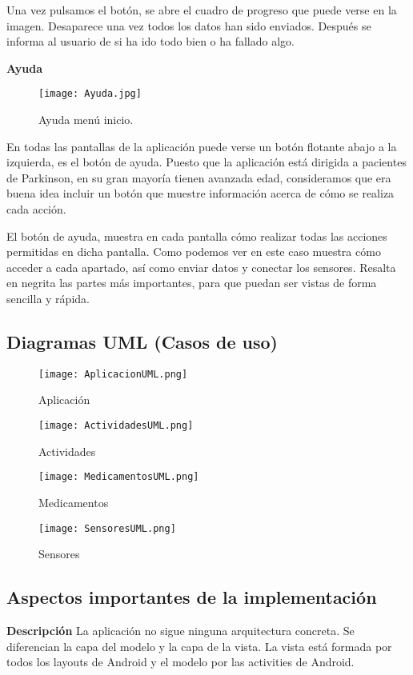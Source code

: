 \documentclass[11pt,spanish]{article}
\begin{document}
Una vez pulsamos el botón, se abre el cuadro de progreso que puede verse en la imagen. Desaparece una vez todos los datos han sido enviados. Después se informa al usuario de si ha ido todo bien o ha fallado algo.
\newline

{\bf Ayuda}
\begin{figure}[h!]
\centering
\texttt{[image: Ayuda.jpg]}
\caption{Ayuda menú inicio.}
\end{figure}

En todas las pantallas de la aplicación puede verse un botón flotante abajo a la izquierda, es el botón de ayuda. Puesto que la aplicación está dirigida a pacientes de Parkinson, en su gran mayoría tienen avanzada edad, consideramos que era buena idea incluir un botón que muestre información acerca de cómo se realiza cada acción.
\newline

El botón de ayuda, muestra en cada pantalla cómo realizar todas las acciones permitidas en dicha pantalla. Como podemos ver en este caso muestra cómo acceder a cada apartado, así como enviar datos y conectar los sensores. Resalta en negrita las partes más importantes, para que puedan ser vistas de forma sencilla y rápida.
\newpage

\subsection{Diagramas UML (Casos de uso)}
\begin{figure}[!htb]
  \texttt{[image: AplicacionUML.png]}
  \caption{Aplicación}
\endminipage\hfill
{}
  \texttt{[image: ActividadesUML.png]}
  \caption{Actividades}
\endminipage\hfill
\end{figure}

\begin{figure}[!htb]
%
  \texttt{[image: MedicamentosUML.png]}
  \caption{Medicamentos}
\endminipage
{}%
  \texttt{[image: SensoresUML.png]}
  \caption{Sensores}
\endminipage
\end{figure}
\newpage

\subsection{Aspectos importantes de la implementación}
{\bf Descripción}
\newline
\newline
La aplicación no sigue ninguna arquitectura concreta. Se diferencian la capa del modelo y la capa de la vista. La vista está formada por todos los layouts de Android y el modelo por las activities de Android.
\newline
\end{document}
